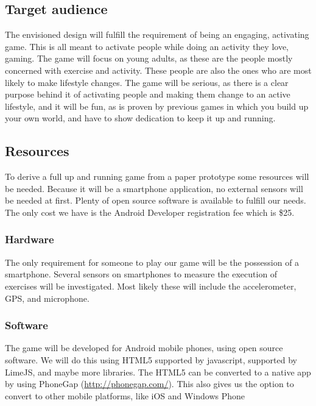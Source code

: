 \documentclass[a4paper,11pt,notitlepage]{report}
\begin{document}
\subsection{Target audience}
The envisioned design will fulfill the requirement of being an engaging, activating game. This is all meant to activate people while doing an activity they love, gaming. The game will focus on young adults, as these are the people mostly concerned with exercise and activity. These people are also the ones who are most likely to make lifestyle changes. The game will be serious, as there is a clear purpose behind it of activating people and making them change to an active lifestyle, and it will be fun, as is proven by previous games in which you build up your own world, and have to show dedication to keep it up and running.
\subsection{Resources}
To derive a full up and running game from a paper prototype some resources will be needed. Because it will be a smartphone application, no external sensors will be needed at first. Plenty of open source software is available to fulfill our needs. The only cost we have is the Android Developer registration fee which is \$25.
\subsubsection{Hardware}
The only requirement for someone to play our game will be the possession of a smartphone. Several sensors on smartphones to measure the execution of exercises will be investigated. Most likely these will include the accelerometer, GPS, and microphone.
\subsubsection{Software}
The game will be developed for Android mobile phones, using open source software. 
We will do this using HTML5 supported by javascript, supported by LimeJS, and maybe more libraries. The HTML5 can be converted to a native app by using PhoneGap (\url{http://phonegap.com/}). This also gives us the option to convert to other mobile platforms, like iOS and Windows Phone



%
%
\end{document}

